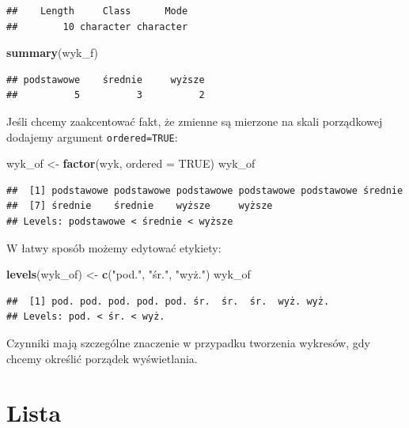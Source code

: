 \documentclass[]{book}
\newenvironment{Shaded}{\begin{snugshade}}{\end{snugshade}}
\newcommand{\KeywordTok}[1]{\textcolor[rgb]{0.13,0.29,0.53}{\textbf{#1}}}
\newcommand{\DataTypeTok}[1]{\textcolor[rgb]{0.13,0.29,0.53}{#1}}
\newcommand{\StringTok}[1]{\textcolor[rgb]{0.31,0.60,0.02}{#1}}
\newcommand{\OtherTok}[1]{\textcolor[rgb]{0.56,0.35,0.01}{#1}}
\newcommand{\NormalTok}[1]{#1}
\begin{document}
\begin{verbatim}
##    Length     Class      Mode 
##        10 character character
\end{verbatim}

\begin{Shaded}
\begin{Highlighting}[]
\KeywordTok{summary}\NormalTok{(wyk_f)}
\end{Highlighting}
\end{Shaded}

\begin{verbatim}
## podstawowe    średnie     wyższe 
##          5          3          2
\end{verbatim}

Jeśli chcemy zaakcentować fakt, że zmienne są mierzone na skali
porządkowej dodajemy argument \texttt{ordered=TRUE}:

\begin{Shaded}
\begin{Highlighting}[]
\NormalTok{wyk_of <-}\StringTok{ }\KeywordTok{factor}\NormalTok{(wyk, }\DataTypeTok{ordered =} \OtherTok{TRUE}\NormalTok{)}
\NormalTok{wyk_of}
\end{Highlighting}
\end{Shaded}

\begin{verbatim}
##  [1] podstawowe podstawowe podstawowe podstawowe podstawowe średnie   
##  [7] średnie    średnie    wyższe     wyższe    
## Levels: podstawowe < średnie < wyższe
\end{verbatim}

W łatwy sposób możemy edytować etykiety:

\begin{Shaded}
\begin{Highlighting}[]
\KeywordTok{levels}\NormalTok{(wyk_of) <-}\StringTok{ }\KeywordTok{c}\NormalTok{(}\StringTok{"pod."}\NormalTok{, }\StringTok{"śr."}\NormalTok{, }\StringTok{"wyż."}\NormalTok{)}
\NormalTok{wyk_of}
\end{Highlighting}
\end{Shaded}

\begin{verbatim}
##  [1] pod. pod. pod. pod. pod. śr.  śr.  śr.  wyż. wyż.
## Levels: pod. < śr. < wyż.
\end{verbatim}

Czynniki mają szczególne znaczenie w przypadku tworzenia wykresów, gdy
chcemy określić porządek wyświetlania.

\section{Lista}\label{lista}
\end{document}
